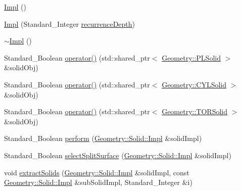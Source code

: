 \begin{DoxyCompactItemize}
\item 
\hyperlink{classMcCAD_1_1Decomposition_1_1DecomposeSolid_1_1Impl_aa6127a34d15e303ba1f6759de099a2aa}{Impl} ()
\item 
\hyperlink{classMcCAD_1_1Decomposition_1_1DecomposeSolid_1_1Impl_a7fe8e66fd558070fdb9f08e2a0013357}{Impl} (Standard\+\_\+\+Integer \hyperlink{classMcCAD_1_1Decomposition_1_1DecomposeSolid_1_1Impl_ad908b2687b52f636d8368b814aa5f770}{recurrence\+Depth})
\item 
\hyperlink{classMcCAD_1_1Decomposition_1_1DecomposeSolid_1_1Impl_af8f2e7a534dc2c7bb8d9553a3e6df4e2}{$\sim$\+Impl} ()
\item 
Standard\+\_\+\+Boolean \hyperlink{classMcCAD_1_1Decomposition_1_1DecomposeSolid_1_1Impl_a72113129aea63c20631338a8f5d4022b}{operator()} (std\+::shared\+\_\+ptr$<$ \hyperlink{classMcCAD_1_1Geometry_1_1PLSolid}{Geometry\+::\+P\+L\+Solid} $>$ \&solid\+Obj)
\item 
Standard\+\_\+\+Boolean \hyperlink{classMcCAD_1_1Decomposition_1_1DecomposeSolid_1_1Impl_a8038247034f4fbe8ac347bd59bbfe8c9}{operator()} (std\+::shared\+\_\+ptr$<$ \hyperlink{classMcCAD_1_1Geometry_1_1CYLSolid}{Geometry\+::\+C\+Y\+L\+Solid} $>$ \&solid\+Obj)
\item 
Standard\+\_\+\+Boolean \hyperlink{classMcCAD_1_1Decomposition_1_1DecomposeSolid_1_1Impl_ad71d1518625461aa5c67c85dba1c700d}{operator()} (std\+::shared\+\_\+ptr$<$ \hyperlink{classMcCAD_1_1Geometry_1_1TORSolid}{Geometry\+::\+T\+O\+R\+Solid} $>$ \&solid\+Obj)
\item 
Standard\+\_\+\+Boolean \hyperlink{classMcCAD_1_1Decomposition_1_1DecomposeSolid_1_1Impl_aa65d0c829adf71764f3d1954cd8d6829}{perform} (\hyperlink{classMcCAD_1_1Geometry_1_1Solid_1_1Impl}{Geometry\+::\+Solid\+::\+Impl} \&solid\+Impl)
\item 
Standard\+\_\+\+Boolean \hyperlink{classMcCAD_1_1Decomposition_1_1DecomposeSolid_1_1Impl_a99e2391d75cc9f871a0cb9f984b67e24}{select\+Split\+Surface} (\hyperlink{classMcCAD_1_1Geometry_1_1Solid_1_1Impl}{Geometry\+::\+Solid\+::\+Impl} \&solid\+Impl)
\item 
void \hyperlink{classMcCAD_1_1Decomposition_1_1DecomposeSolid_1_1Impl_a80861ddb3269bb59b3f2333201836e43}{extract\+Solids} (\hyperlink{classMcCAD_1_1Geometry_1_1Solid_1_1Impl}{Geometry\+::\+Solid\+::\+Impl} \&solid\+Impl, const \hyperlink{classMcCAD_1_1Geometry_1_1Solid_1_1Impl}{Geometry\+::\+Solid\+::\+Impl} \&sub\+Solid\+Impl, Standard\+\_\+\+Integer \&i)
\end{DoxyCompactItemize}
